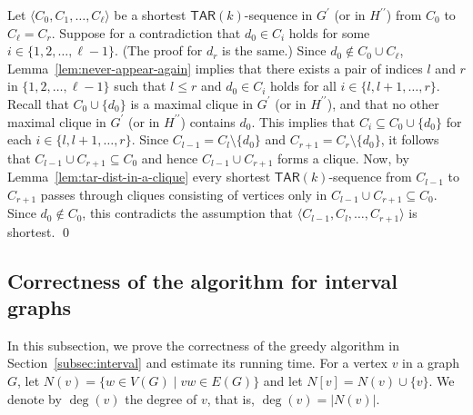 \documentclass{llncs}
\newcommand{\TAR}[1]{\mathsf{TAR}(#1)}
\newcommand{\ini}{0}
\newcommand{\tar}{r}
\newcommand{\cliq}{C}
\newcommand{\dumo}{d_{\ini}}
\newcommand{\dumt}{d_{\tar}}
\begin{document}
	Let $\langle \cliq_{0}, \cliq_1, \ldots, \cliq_{\ell} \rangle$ be a shortest $\TAR{k}$-sequence in $G^\prime$ (or in $H^{\prime \prime}$) from $\cliq_{\ini}$ to $\cliq_{\ell} = \cliq_{\tar}$.
	Suppose for a contradiction that $\dumo \in \cliq_{i}$ holds for some $i \in \{1, 2, \ldots, \ell-1\}$.
(The proof for $\dumt$ is the same.)
	Since $\dumo \notin \cliq_{\ini} \cup \cliq_{\ell}$, Lemma~\ref{lem:never-appear-again} implies that there exists a pair of indices $l$ and $r$ in $\{1, 2, \ldots, \ell-1\}$ such that $l \le r$ and $\dumo \in \cliq_{i}$ holds for all $i \in \{l, l+1, \ldots, r\}$.
	Recall that $\cliq_{\ini} \cup \{\dumo\}$ is a maximal clique in $G^\prime$ (or in $H^{\prime \prime}$), and that no other maximal clique in $G^\prime$ (or in $H^{\prime \prime}$) contains $\dumo$.
	This implies that $\cliq_{i} \subseteq \cliq_{\ini} \cup \{\dumo\}$ for each $i \in \{l, l+1, \ldots, r\}$.
	Since $\cliq_{l-1} = \cliq_{l} \setminus \{\dumo\}$ and $\cliq_{r+1} = \cliq_{r} \setminus \{\dumo\}$, it follows that $\cliq_{l-1} \cup \cliq_{r+1} \subseteq \cliq_{\ini}$ and hence $\cliq_{l-1} \cup \cliq_{r+1}$ forms a clique.
	Now, by Lemma~\ref{lem:tar-dist-in-a-clique} every shortest $\TAR{k}$-sequence from $\cliq_{l-1}$ to $\cliq_{r+1}$ passes through cliques consisting of vertices only in $\cliq_{l-1} \cup \cliq_{r+1} \subseteq \cliq_{\ini}$.
	Since $\dumo \not\in \cliq_{\ini}$, this contradicts the assumption that $\langle \cliq_{l-1}, \cliq_{l}, \ldots, \cliq_{r+1} \rangle$ is shortest.
\qed




	\subsection{Correctness of the algorithm for interval graphs} \label{app:interval-algo}
	
	In this subsection, we prove the correctness of the greedy algorithm in Section~\ref{subsec:interval} and estimate its running time.
	For a vertex $v$ in a graph $G$, let $N(v) = \{w \in V(G) \mid vw \in E(G) \}$ and let $N[v] = N(v)\cup\{v\}$.
	We denote by $\deg(v)$ the degree of $v$, that is, $\deg(v) = |N(v)|$.
\medskip
\end{document}
